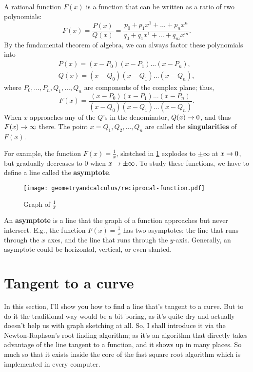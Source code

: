 A rational function $F(x)$ is a function that can be written as a ratio of two polynomials:
\begin{equation}
	F(x) = \frac{P(x)}{Q(x)} = \frac{p_0 + p_1x^1 + \dots + p_nx^n}{q_0 + q_1x^1 + \dots + q_mx^m}.
\end{equation}
By the fundamental theorem of algebra, we can always factor these polynomials into
\begin{equation}
	\begin{multlined}
		P(x) = (x - P_0)(x - P_1)\dots(x - P_n), \\
		Q(x) = (x - Q_0)(x - Q_1)\dots(x - Q_n),
	\end{multlined}
\end{equation}
where $P_0, \dots, P_n, Q_1, \dots, Q_n$ are components of the complex plane; thus,
\begin{equation}
	F(x) = \frac{(x - P_0)(x - P_1)\dots(x - P_n)}{(x - Q_0)(x - Q_1)\dots(x - Q_n)}.
\end{equation}
When $x$ approaches any of the $Q$'s in the denominator, $Q(x) \rightarrow 0$, and thus $F(x) \rightarrow \infty$ there. The point $x = Q_1, Q_2, \dots, Q_n$ are called the \textbf{singularities} of $F(x)$.

For example, the function $F(x) = \frac{1}{x}$, sketched in \cref{fig:reciprocal-function} explodes to $\pm\infty$ at $x \rightarrow 0$, but gradually decreases to $0$ when $x \rightarrow \pm\infty$. To study these functions, we have to define a line called the \textbf{asymptote}.
\begin{figure}[ht]
	\centering
	\texttt{[image: geometryandcalculus/reciprocal-function.pdf]}
	\caption{Graph of $\frac{1}{x}$}
	\label{fig:reciprocal-function}
\end{figure}

An \textbf{asymptote} is a line that the graph of a function approaches but never intersect. E.g., the function $F(x) = \frac{1}{x}$ has two asymptotes: the line that runs through the $x$ axes, and the line that runs through the $y$-axis. Generally, an asymptote could be horizontal, vertical, or even slanted.

\section{Tangent to a curve}

In this section, I'll show you how to find a line that's tangent to a curve. But to do it the traditional way would be a bit boring, as it's quite dry and actually doesn't help us with graph sketching at all. So, I shall introduce it via the Newton-Raphson's root finding algorithm; as it's an algorithm that directly takes advantage of the line tangent to a function, and it shows up in many places. So much so that it exists inside the core of the fast square root algorithm which is implemented in every computer.


